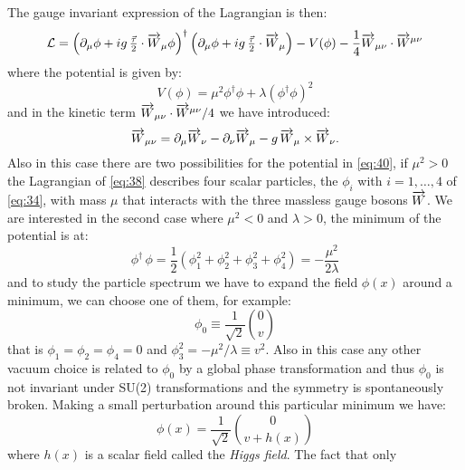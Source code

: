 The gauge invariant expression of the Lagrangian is then:
\begin{equation}
  \label{eq:38}
  \mathcal{L} = \left( \partial_{\mu} \phi + i g\,\tfrac{\vec \tau}{2}
  \cdot \overrightarrow{W}_{\mu} \phi \right)^{\dagger} \left(\partial_{\mu} \phi + i
  g\,\tfrac{\vec \tau}{2} \cdot \overrightarrow{W}_{\mu} \right) - V(\phi) -
  \frac{1}{4} \overrightarrow{W}_{\mu\nu} \cdot \overrightarrow{W}^{\mu\nu}
\end{equation}
where the potential is given by:
\begin{equation}
  \label{Esq:40}
  V(\phi) = \mu^{2} \phi^{\dagger} \phi + \lambda(\phi^{\dagger} \phi)^{2}
\end{equation}
and in the kinetic term $\overrightarrow{W}_{\mu\nu} \cdot \overrightarrow{W}^{\mu\nu}/4$ we have
introduced:
\begin{equation}
  \label{eq:39}
  \overrightarrow{W}_{\mu\nu} = \partial_{\mu} \overrightarrow{W}_{\nu} - \partial_{\nu} \overrightarrow{W}_{\mu}
  - g\,\overrightarrow{W}_{\mu} \times \overrightarrow{W}_{\nu}.
\end{equation}
Also in this case there are two possibilities for the potential in \cref{eq:40},
if $\mu^2 > 0$ the Lagrangian of \cref{eq:38} describes four scalar particles,
the $\phi_i$ with $i = 1, \dots, 4$ of \cref{eq:34}, with mass $\mu$ that
interacts with the three massless gauge bosons $\overrightarrow{W}$. We are interested in
the second case where $\mu^{2} < 0$ and $\lambda > 0$, the minimum of the
potential is at:
\begin{equation}
  \label{eq:40}
  \phi^{\dagger}\,\phi = \frac{1}{2} \left(\phi_{1}^{2} + \phi_{2}^{2} +
    \phi_{3}^{2} + \phi_{4}^{2} \right) = - \frac{\mu^{2}}{2 \lambda}
\end{equation}
and to study the particle spectrum we have to expand the field $\phi(x)$ around
a minimum, we can choose one of them, for example:
\begin{equation}
  \label{eq:41}
  \phi_{0} \equiv \frac{1}{\sqrt{2}} \binom{0}{v}
\end{equation}
that is $\phi_{1} = \phi_{2} = \phi_{4} = 0$ and
$\phi_{3}^{2} = - \mu^{2}/\lambda \equiv v^{2}$. Also in this case any other
vacuum choice is related to $\phi_0$ by a global phase transformation and thus
$\phi_0$ is not invariant under SU(2) transformations and the symmetry is
spontaneously broken. Making a small perturbation around this particular minimum
we have:
\begin{equation}
  \label{eq:43}
  \phi (x) = \frac{1}{\sqrt{2}} \binom{0}{v + h(x)}
\end{equation}
where $h(x)$ is a scalar field called the \emph{Higgs field}. The fact that only
